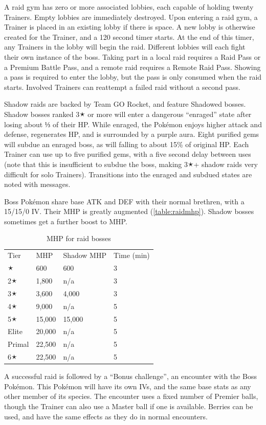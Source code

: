 A raid gym has zero or more associated lobbies, each capable of holding twenty Trainers.
Empty lobbies are immediately destroyed.
Upon entering a raid gym, a Trainer is placed in an existing lobby if there is space.
A new lobby is otherwise created for the Trainer, and a 120 second timer starts.
At the end of this timer, any Trainers in the lobby will begin the raid.
Different lobbies will each fight their own instance of the boss.
Taking part in a local raid requires a Raid Pass or a Premium Battle Pass,
  and a remote raid requires a Remote Raid Pass.
Showing a pass is required to enter the lobby, but the pass is only consumed when the raid starts.
Involved Trainers can reattempt a failed raid without a second pass.

Shadow raids are backed by Team GO Rocket, and feature Shadowed bosses.
Shadow bosses ranked 3🟉 or more will enter a dangerous ``enraged'' state after losing about ⅓ of their HP.
While enraged, the Pokémon enjoys higher attack and defense, regenerates HP, and is surrounded by a purple aura.
Eight purified gems will subdue an enraged boss, as will falling to about 15\% of original HP.
Each Trainer can use up to five purified gems, with a five second delay between uses
 (note that this is insufficient to subdue the boss, making 3🟉+ shadow raids
 very difficult for solo Trainers).
Transitions into the enraged and subdued states are noted with messages.

Boss Pokémon share base ATK and DEF with their normal brethren, with a 15/15/0 IV\@.
Their MHP is greatly augmented (\autoref{table:raidmhp}).
Shadow bosses sometimes get a further boost to MHP\@.
\begin{table}
\centering
\begin{tabular}{llll}
  Tier & MHP & Shadow MHP & Time (min)\\
  \Midrule
  1🟉 & 600 & 600 & 3 \\
  2🟉 & 1,800 & n/a & 3\\
  3🟉 & 3,600 & 4,000 & 3\\
  4🟉 & 9,000 & n/a & 5\\
  5🟉 & 15,000 & 15,000 & 5\\
  Elite & 20,000 & n/a & 5\\
  Primal & 22,500 & n/a & 5\\
  6🟉 & 22,500 & n/a & 5\\
\end{tabular}
\caption{MHP for raid bosses}
\label{table:raidmhp}
\end{table}
A successful raid is followed by a ``Bonus challenge'', an encounter with the Boss Pokémon.
This Pokémon will have its own IVs, and the same base stats as any other member of its species.
The encounter uses a fixed number of Premier balls, though the Trainer can also
  use a Master ball if one is available.
Berries can be used, and have the same effects as they do in normal encounters.


